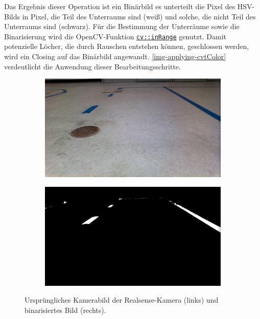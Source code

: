 \documentclass[a4paper,12pt]{report}
\begin{document}
	Das Ergebnis dieser Operation ist ein Binärbild es unterteilt die Pixel des HSV-Bilds in Pixel, die Teil des Unterraums sind (weiß) und solche, die nicht Teil des Unterraums sind (schwarz).
	Für die Bestimmung der Unterräume sowie die Binarisierung wird die OpenCV-Funktion \href{https://docs.opencv.org/3.4.0/d2/de8/group\_\_core\_\_array.html\#ga48af0ab51e36436c5d04340e036ce981}{\texttt{cv::inRange}} \cite{opencv-doc} genutzt.
	Damit potenzielle Löcher, die durch Rauschen entstehen können, geschlossen werden, wird ein Closing auf das Binärbild angewandt.
	\autoref{img-applying-cvtColor} verdeutlicht die Anwendung dieser Bearbeitungsschritte.

	\begin{figure}
		\centering
		\begin{subfigure}[c]{0.45\textwidth}
			\includegraphics[width=\textwidth]{assets/Strasse.png}
		\end{subfigure}
		\begin{subfigure}[c]{0.45\textwidth}
			\includegraphics[width=\textwidth]{assets/Strasse-Binaer.png}
		\end{subfigure}
		\caption{Ursprüngliches Kamerabild der Realsense-Kamera (links) und binarisiertes Bild (rechts).}
		\label{img-applying-cvtColor}
	\end{figure}
\end{document}
